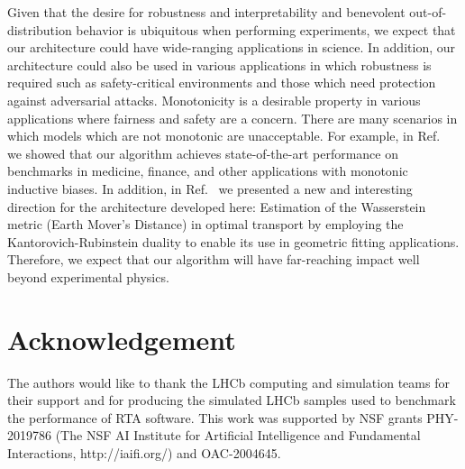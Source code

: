 \documentclass{article}
\begin{document}
Given that the desire for robustness and interpretability and benevolent out-of-distribution behavior is ubiquitous when performing experiments, we expect that our architecture could have wide-ranging applications in science. 
In addition, our architecture could also be used
in various applications in which robustness is required such as safety-critical environments
and those which need protection against adversarial attacks. 
Monotonicity is a desirable property in various applications where fairness and safety are a concern. 
There are many scenarios in which models which are not monotonic are unacceptable. For example, 
in Ref.~\cite{ICLR-Mono} we showed that our algorithm achieves state-of-the-art performance on benchmarks in medicine, finance, and other applications with monotonic inductive biases.  
In addition, in Ref.~\cite{NEEMo} we presented a new and interesting direction for the architecture developed here: Estimation of the Wasserstein metric (Earth Mover's Distance) in optimal transport by employing the Kantorovich-Rubinstein duality to enable its use in geometric fitting applications.
Therefore, we expect that our algorithm will have far-reaching impact well beyond  experimental physics. 





\section*{Acknowledgement}
The authors would like to thank the LHCb computing and simulation teams for their support and for producing the simulated LHCb samples used to benchmark the performance of RTA software. This work was supported by NSF grants PHY-2019786 (The NSF AI Institute for Artificial Intelligence and Fundamental Interactions, http://iaifi.org/) and OAC-2004645. 




\end{document}
